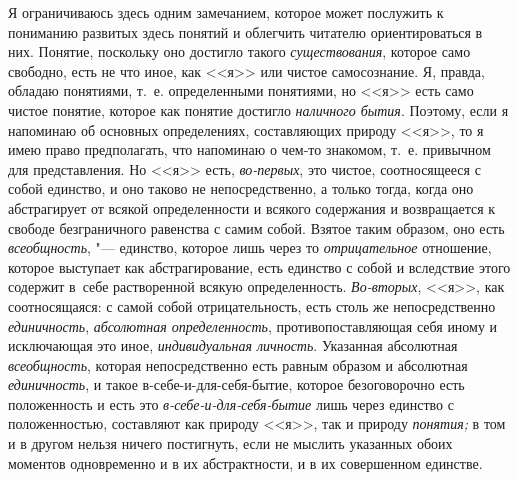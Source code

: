 Я ограничиваюсь здесь одним замечанием, которое может послужить к пониманию
развитых здесь понятий и облегчить читателю ориентироваться в них. Понятие,
поскольку оно достигло такого {\em существования}, которое само свободно,
есть не что иное, как <<я>> или чистое самосознание. Я, правда, обладаю
понятиями, т.~е. определенными понятиями, но <<я>> есть само чистое понятие,
которое как понятие достигло {\em наличного бытия}. Поэтому, если я напоминаю
об основных определениях, составляющих природу <<я>>, то я имею право
предполагать, что напоминаю о чем-то знакомом, т.~е. привычном для
представления. Но <<я>> есть, {\em во-первых}, это чистое, соотносящееся с собой
единство, и оно таково не непосредственно, а только тогда, когда оно
абстрагирует от всякой определенности и всякого содержания и возвращается к
свободе безграничного равенства с самим собой. Взятое таким образом, оно
есть {\em всеобщность}, "--- единство, которое лишь через то {\em отрицательное}
отношение, которое выступает как абстрагирование, есть единство с собой и
вследствие этого содержит в~себе растворенной всякую определенность.
{\em Во-вторых}, <<я>>, как соотносящаяся: с самой собой отрицательность, есть
столь же непосредственно {\em единичность}, {\em абсолютная определенность},
противопоставляющая себя иному и исключающая это иное, {\em индивидуальная
личность}. Указанная абсолютная {\em всеобщность}, которая непосредственно есть
равным образом и абсолютная {\em единичность}, и такое в-себе-и-для-себя-бытие,
которое безоговорочно есть положенность и есть это
{\em в-себе-и-для-себя-бытие} лишь через единство с положенностью, составляют
как природу <<я>>, так и природу {\em понятия;} в том и в другом нельзя ничего
постигнуть, если не мыслить указанных обоих моментов одновременно и в их
абстрактности, и в их совершенном единстве.

